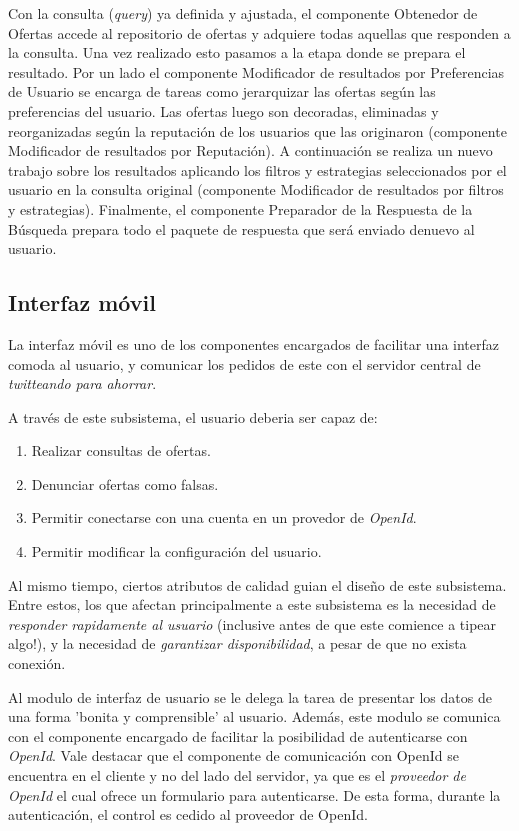Con la consulta (\emph{query}) ya definida y ajustada, el componente \textsf{Obtenedor de Ofertas} accede al repositorio de ofertas y adquiere todas aquellas que responden a la consulta.  Una vez realizado esto pasamos a la etapa donde se prepara el resultado. Por un lado el componente \textsf{Modificador de resultados por Preferencias de Usuario} se encarga de tareas como jerarquizar las ofertas según las preferencias del usuario. Las ofertas luego son decoradas, eliminadas y reorganizadas según la reputación de los usuarios que las originaron (componente \textsf{Modificador de resultados por Reputación}). A continuación se realiza un nuevo trabajo sobre los resultados aplicando los filtros y estrategias seleccionados por el usuario en la consulta original (componente \textsf{Modificador de resultados por filtros y estrategias}). Finalmente, el componente \textsf{Preparador de la Respuesta de la Búsqueda} prepara todo el paquete de respuesta que será enviado denuevo al usuario. 

\subsection{Interfaz móvil}

La interfaz móvil es uno de los componentes encargados de facilitar una interfaz comoda al usuario, y comunicar los pedidos de este con el servidor central de \emph{twitteando para ahorrar}.

A través de este subsistema, el usuario deberia ser capaz de:
\begin{enumerate}
	\item Realizar consultas de ofertas.
	\item Denunciar ofertas como falsas.
	\item Permitir conectarse con una cuenta en un provedor de \emph{OpenId}.
	\item Permitir modificar la configuración del usuario.
\end{enumerate}

Al mismo tiempo, ciertos atributos de calidad guian el diseño de este subsistema. Entre estos, los que afectan principalmente a este subsistema es la necesidad de \emph{responder rapidamente al usuario} (inclusive antes de que este comience a tipear algo!), y la necesidad de \emph{garantizar disponibilidad}, a pesar de que no exista conexión.

Al modulo de interfaz de usuario se le delega la tarea de presentar los datos de una forma 'bonita y comprensible' al usuario. Además, este modulo se comunica con el componente encargado de facilitar la posibilidad de autenticarse con \emph{OpenId}. Vale destacar que el componente de comunicación con OpenId se encuentra en el cliente y no del lado del servidor, ya que es el \emph{proveedor de OpenId} el cual ofrece un formulario para autenticarse. De esta forma, durante la autenticación, el control es cedido al proveedor de OpenId.

